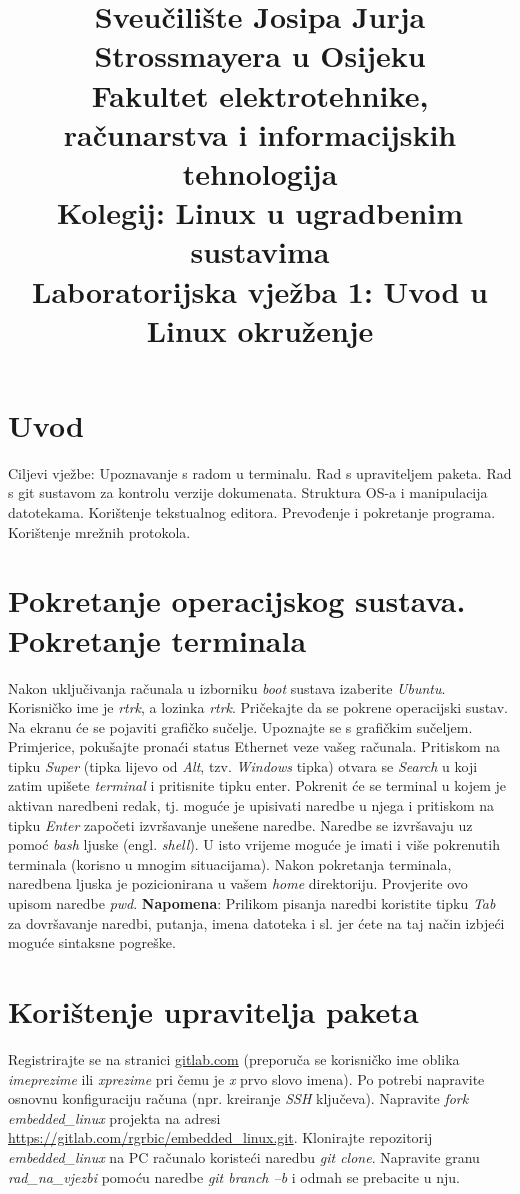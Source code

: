 \documentclass[11pt]{article}
\title{
	\Large Sveučilište Josipa Jurja Strossmayera u Osijeku \\
	Fakultet elektrotehnike, računarstva i informacijskih tehnologija \\
	\vspace{4cm}
	\Large Kolegij: Linux u ugradbenim sustavima \\
	\vspace{4cm}
	\Large \textbf{Laboratorijska vježba 1: Uvod u Linux okruženje}
	}
\date{}
\begin{document}
\maketitle
\thispagestyle{empty}
\newpage

\section{Uvod}
Ciljevi vježbe: Upoznavanje s radom u terminalu. Rad s upraviteljem paketa.
Rad s git sustavom za kontrolu verzije dokumenata. Struktura OS-a i manipulacija datotekama. Korištenje tekstualnog
editora. Prevođenje i pokretanje programa. Korištenje mrežnih protokola.

\section{Pokretanje operacijskog sustava. Pokretanje terminala}
Nakon uključivanja računala u izborniku \textit{boot} sustava izaberite
\textit{Ubuntu}. Korisničko ime je \textit{rtrk}, a lozinka \textit{rtrk}.
Pričekajte da se pokrene operacijski sustav. Na ekranu će se pojaviti
grafičko sučelje. Upoznajte se s grafičkim sučeljem. Primjerice, pokušajte
pronaći status Ethernet veze vašeg računala.
\newline
\newline
Pritiskom na tipku \textit{Super} (tipka lijevo od \textit{Alt}, tzv.
\textit{Windows} tipka) otvara se \textit{Search} u koji zatim upišete
 \textit{terminal} i pritisnite tipku enter. Pokrenit će se terminal u kojem je
 aktivan naredbeni redak, tj. moguće je upisivati naredbe u njega i pritiskom
 na tipku \textit{Enter} započeti izvršavanje unešene naredbe. Naredbe se
 izvršavaju uz pomoć \textit{bash} ljuske (engl. \textit{shell}). U isto
 vrijeme moguće je imati i više pokrenutih terminala (korisno u mnogim
 situacijama). Nakon pokretanja terminala, naredbena ljuska je pozicionirana
 u vašem \textit{home} direktoriju. Provjerite ovo upisom naredbe \textit{pwd}.
\newline
\newline
\textbf{Napomena}: Prilikom pisanja naredbi koristite tipku \textit{Tab} za
 dovršavanje naredbi, putanja, imena datoteka i sl. jer ćete na taj način
 izbjeći moguće sintaksne pogreške.
 \section{Korištenje upravitelja paketa}
Registrirajte se na stranici \url{gitlab.com} (preporuča se korisničko ime
 oblika \textit{imeprezime} ili \textit{xprezime} pri čemu je \textit{x} prvo
 slovo imena). Po potrebi napravite osnovnu konfiguraciju računa (npr.
 kreiranje \textit{SSH} ključeva). Napravite \textit{fork}
 \textit{embedded\_linux} projekta na adresi
 \url{https://gitlab.com/rgrbic/embedded\_linux.git}.
 \newline
 \newline
 Klonirajte repozitorij \textit{embedded\_linux} na PC računalo koristeći
 naredbu \textit{git clone}. Napravite granu \textit{rad\_na\_vjezbi} pomoću
 naredbe \textit{git branch –b} i odmah se prebacite u nju.
\end{document}
